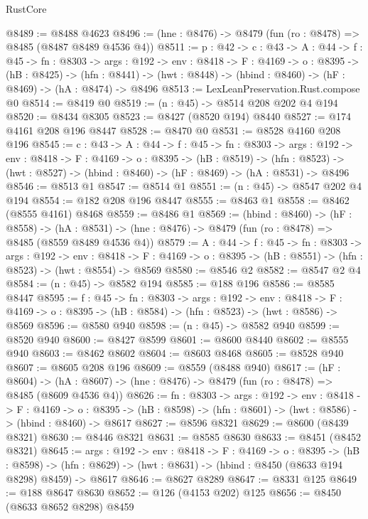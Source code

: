\begin{lexlean}{RustCore}
\begin{coremodule}
@8489 := @8488 @4623
@8496 := (hne : @8476) -> @8479 (fun (ro : @8478) => @8485 (@8487 @8489 @4536 @4))
@8511 := {p : @42} ->
  {c : @43} ->
  {A : @44} ->
  {f : @45} ->
  {fn : @8303} ->
  {args : @192} ->
  {env : @8418} ->
  {F : @4169} ->
  {o : @8395} ->
  (hB : @8425) ->
  (hfn : @8441) -> (hwt : @8448) -> (hbind : @8460) -> (hF : @8469) -> (hA : @8474) -> @8496
@8513 := LexLeanPreservation.Rust.compose @0
@8514 := @8419 @0
@8519 := (n : @45) -> @8514 @208 @202 @4 @194
@8520 := @8434 @8305
@8523 := @8427 (@8520 @194) @8440
@8527 := @174 @4161 @208 @196 @8447
@8528 := @8470 @0
@8531 := @8528 @4160 @208 @196
@8545 := {c : @43} ->
  {A : @44} ->
  {f : @45} ->
  {fn : @8303} ->
  {args : @192} ->
  {env : @8418} ->
  {F : @4169} ->
  {o : @8395} ->
  (hB : @8519) ->
  (hfn : @8523) -> (hwt : @8527) -> (hbind : @8460) -> (hF : @8469) -> (hA : @8531) -> @8496
@8546 := @8513 @1
@8547 := @8514 @1
@8551 := (n : @45) -> @8547 @202 @4 @194
@8554 := @182 @208 @196 @8447
@8555 := @8463 @1
@8558 := @8462 (@8555 @4161) @8468
@8559 := @8486 @1
@8569 := (hbind : @8460) ->
  (hF : @8558) ->
  (hA : @8531) -> (hne : @8476) -> @8479 (fun (ro : @8478) => @8485 (@8559 @8489 @4536 @4))
@8579 := {A : @44} ->
  {f : @45} ->
  {fn : @8303} ->
  {args : @192} ->
  {env : @8418} ->
  {F : @4169} -> {o : @8395} -> (hB : @8551) -> (hfn : @8523) -> (hwt : @8554) -> @8569
@8580 := @8546 @2
@8582 := @8547 @2 @4
@8584 := (n : @45) -> @8582 @194
@8585 := @188 @196
@8586 := @8585 @8447
@8595 := {f : @45} ->
  {fn : @8303} ->
  {args : @192} ->
  {env : @8418} ->
  {F : @4169} -> {o : @8395} -> (hB : @8584) -> (hfn : @8523) -> (hwt : @8586) -> @8569
@8596 := @8580 @940
@8598 := (n : @45) -> @8582 @940
@8599 := @8520 @940
@8600 := @8427 @8599
@8601 := @8600 @8440
@8602 := @8555 @940
@8603 := @8462 @8602
@8604 := @8603 @8468
@8605 := @8528 @940
@8607 := @8605 @208 @196
@8609 := @8559 (@8488 @940)
@8617 := (hF : @8604) ->
  (hA : @8607) -> (hne : @8476) -> @8479 (fun (ro : @8478) => @8485 (@8609 @4536 @4))
@8626 := {fn : @8303} ->
  {args : @192} ->
  {env : @8418} ->
  {F : @4169} ->
  {o : @8395} -> (hB : @8598) -> (hfn : @8601) -> (hwt : @8586) -> (hbind : @8460) -> @8617
@8627 := @8596 @8321
@8629 := @8600 (@8439 @8321)
@8630 := @8446 @8321
@8631 := @8585 @8630
@8633 := @8451 (@8452 @8321)
@8645 := {args : @192} ->
  {env : @8418} ->
  {F : @4169} ->
  {o : @8395} ->
  (hB : @8598) ->
  (hfn : @8629) -> (hwt : @8631) -> (hbind : @8450 (@8633 @194 @8298) @8459) -> @8617
@8646 := @8627 @8289
@8647 := @8331 @125
@8649 := @188 @8647 @8630
@8652 := @126 (@4153 @202) @125
@8656 := @8450 (@8633 @8652 @8298) @8459

\end{coremodule}
\end{lexlean}
